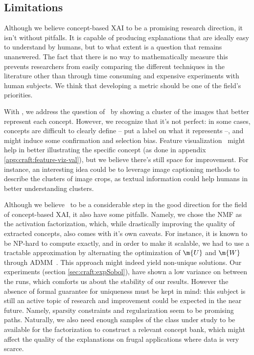 \subsection{Limitations}
\label{apx:craft:limitations}

Although we believe concept-based XAI to be a promising research direction, it isn't without pitfalls. It is capable of producing explanations that are ideally easy to understand by humans, but to what extent is a question that remains unanswered. The fact that there is no way to mathematically measure this prevents researchers from easily comparing the different techniques in the literature other than through time consuming and expensive experiments with human subjects. We think that developing a metric should be one of the field's priorities.%

With \craft, we address the question of \what~by showing a cluster of the images that better represent each concept. However, we recognize that it's not perfect: in some cases, concepts are difficult to clearly define -- put a label on what it represents --, and might induce some confirmation and selection bias. Feature visualization~\cite{olah2017feature} might help in better illustrating the specific concept (as done in appendix \ref{app:craft:feature-viz-val}), but we believe there's still space for improvement. For instance, an interesting idea could be to leverage image captioning methods to describe the clusters of image crops, as textual information could help humans in better understanding clusters.

Although we believe \craft~to be a considerable step in the good direction for the field of concept-based XAI, it also have some pitfalls. Namely, we chose the NMF as the activation factorization, which, while drastically improving the quality of extracted concepts, also comes with it's own caveats. For instance, it is known to be NP-hard to compute exactly, and in order to make it scalable, we had to use a tractable approximation by alternating the optimization of $\m{U}$ and $\m{W}$ through ADMM~\cite{boyd2011distributed}. This approach might indeed yield non-unique solutions. Our experiments (section \ref{sec:craft:expSobol}), have shown a low variance on between the runs, which comforts us about the stability of our results.%
However the absence of formal guarantee for uniqueness must be kept in mind: this subject is still an active topic of research and improvement could be expected in the near future. Namely, sparsity constraints and regularization seem to be promising paths.
Naturally, we also need enough samples of the class under study to be available for the factorization to construct a relevant concept bank, which might affect the quality of the explanations on frugal applications where data is very scarce. %

